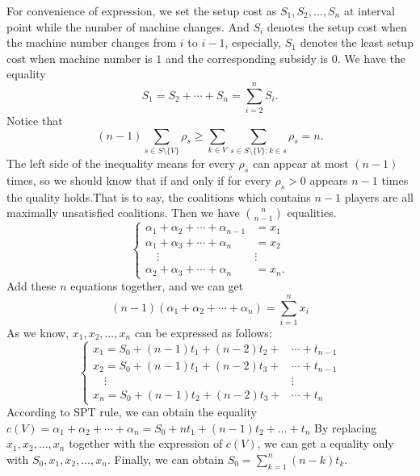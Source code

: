 \documentclass[UTF8]{ctexart}
\begin{document}
For convenience of expression, we set the setup cost as $S_{1},S_{2}, \dots ,S_{n}$ at interval point while the number of machine changes.
And $S_{i}$ denotes the setup cost when the machine number changes from $i$ to $i-1$, especially, $S_{1}$ denotes the least setup cost when machine number is $1$ and the corresponding subsidy is $0$.
We have the equality
\begin{displaymath}
  S_{1}=S_{2}+\cdots+S_{n}=\sum_{i=2}^n S_i.
\end{displaymath}
Notice that
\begin{displaymath}
  (n-1) \sum_{s \in S \setminus\{V\} } \rho_s \geq
  \sum_{k\in V}\sum_{s \in S \setminus\{V\}:k \in s} \rho_s = n.
\end{displaymath}
The left side of the inequality means for every $\rho_s$ can appear at most $(n-1)$ times, so we should know that if and only if for every $\rho_s > 0$ appears $n-1$ times the quality holds.That is to say, the coalitions which contains $n-1$ players are all maximally unsatisfied coalitions. Then we have $n \choose n-1$ equalities.
\[
\begin{cases}
 \alpha_1+\alpha_2+ \cdots+\alpha_{n-1} & = x_1 \\
 \alpha_1+\alpha_3+ \cdots+\alpha_n & = x_2 \\
 \quad   \vdots        &\vdots\\
 \alpha_2+\alpha_3+ \cdots+\alpha_n & = x_n.
\end{cases}
\]
Add these $n$ equations together, and we can get
\begin{equation*}
  (n-1)(\alpha_1+\alpha_2+ \cdots+\alpha_n)=\sum_{i=1}^{n}x_i
\end{equation*}
As we know, $x_1,x_2,\dots,x_n$ can be expressed as follows:
\[
\begin{cases}
x_1 = S_0 + (n-1)t_1 + (n-2)t_2 + &\cdots + t_{n-1} \\
x_2 = S_0 + (n-1)t_1 + (n-2)t_3 + &\cdots + t_{n-1} \\
\quad   \vdots        &\vdots\\
x_n = S_0 + (n-1)t_2 + (n-2)t_3 + &\cdots + t_{n}
\end{cases}
\]
According to SPT rule, we can obtain the equality
$c(V)=\alpha_1+\alpha_2+\cdots+\alpha_n=S_0+nt_1+(n-1)t_2+\dots+t_n$
By replacing $x_1,x_2,\dots,x_n$ together with the expression of $c(V)$, we can get a equality only with $S_0,x_1,x_2,\dots,x_n$.
Finally, we can obtain $S_0 = \sum_{k=1}^n (n-k)t_k$.
\end{document}
